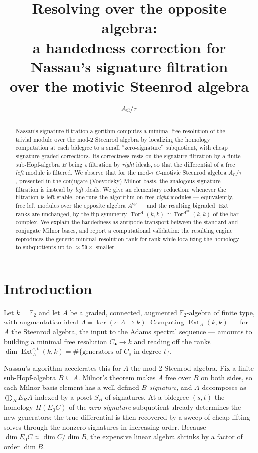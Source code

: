 \documentclass[11pt]{article}
\title{Resolving over the opposite algebra:\\
a handedness correction for Nassau's signature filtration\\
over the motivic Steenrod algebra $\Actau$}
\author{}
\date{}
\theoremstyle{definition}
\DeclareMathOperator{\Ext}{Ext}
\DeclareMathOperator{\Tor}{Tor}
\DeclareMathOperator{\op}{op}
\newcommand{\F}{\mathbb{F}}
\newcommand{\Actau}{A_{\mathbb C}/\tau}
\newcommand{\barA}{\overline{A}}
\newcommand{\Aop}{A^{\op}}
\begin{document}
\maketitle

\begin{abstract}
Nassau's signature-filtration algorithm computes a minimal free resolution of the
trivial module over the mod-$2$ Steenrod algebra by localizing the homology
computation at each bidegree to a small ``zero-signature'' subquotient, with cheap
signature-graded corrections. Its correctness rests on the signature filtration by
a finite sub-Hopf-algebra $B$ being a filtration by \emph{right} ideals, so that the
differential of a free \emph{left} module is filtered. We observe that for the
mod-$\tau$ $C$-motivic Steenrod algebra $\Actau$, presented in the conjugate
(Voevodsky) Milnor basis, the analogous signature filtration is instead by
\emph{left} ideals. We give an elementary reduction: whenever the filtration is
left-stable, one runs the algorithm on free \emph{right} modules --- equivalently,
free left modules over the opposite algebra $\Aop$ --- and the resulting bigraded
$\Ext$ ranks are unchanged, by the flip symmetry $\Tor^A(k,k)\cong\Tor^{\Aop}(k,k)$
of the bar complex. We explain the handedness as antipode transport between the
standard and conjugate Milnor bases, and report a computational validation: the
resulting engine reproduces the generic minimal resolution rank-for-rank while
localizing the homology to subquotients up to $\approx 50\times$ smaller.
\end{abstract}

\section{Introduction}

Let $k=\F_2$ and let $A$ be a graded, connected, augmented $\F_2$-algebra of finite
type, with augmentation ideal $\barA=\ker(\epsilon\colon A\to k)$. Computing
$\Ext_A(k,k)$ --- for $A$ the Steenrod algebra, the input to the Adams spectral
sequence --- amounts to building a minimal free resolution $C_\bullet\to k$ and
reading off the ranks $\dim\Ext^{s,t}_A(k,k)=\#\{\text{generators of }C_s\text{ in
degree }t\}$.

Nassau's algorithm \cite{nassau} accelerates this for $A$ the mod-$2$ Steenrod
algebra. Fix a finite sub-Hopf-algebra $B\subseteq A$. Milnor's theorem makes $A$
free over $B$ on both sides, so each Milnor basis element has a well-defined
\emph{$B$-signature}, and $A$ decomposes as $\bigoplus_R E_R A$ indexed by a poset
$S_B$ of signatures. At a bidegree $(s,t)$ the homology $H(E_0C)$ of the
\emph{zero-signature} subquotient already determines the new generators; the true
differential is then recovered by a sweep of cheap lifting solves through the
nonzero signatures in increasing order. Because $\dim E_0C\approx\dim C/\dim B$, the
expensive linear algebra shrinks by a factor of order $\dim B$.
\end{document}
